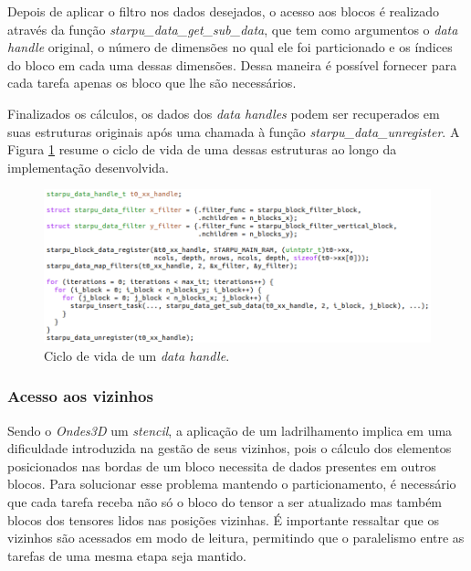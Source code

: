 \documentclass[cic,tc]{iiufrgs}
\begin{document}
Depois de aplicar o filtro nos dados desejados, o acesso aos blocos é realizado através da função \textit{starpu\_data\_get\_sub\_data},
que tem como argumentos o \textit{data handle} original, o número de dimensões no qual ele foi particionado e os índices do bloco em cada
uma dessas dimensões. Dessa maneira é possível fornecer para cada tarefa apenas os bloco que lhe são necessários.

Finalizados os cálculos, os dados dos \textit{data handles} podem ser recuperados em suas estruturas originais após
uma chamada à função \textit{starpu\_data\_unregister}. A Figura \ref{fig:data_cycle} resume o ciclo de vida de uma dessas estruturas ao
longo da implementação desenvolvida.

\begin{figure}[!htb]
  \caption{Ciclo de vida de um \textit{data handle}.}
    \begin{center} 
      \includegraphics[width=35em]{data_cycle}
    \end{center}
    \label{fig:data_cycle}
\end{figure}


\subsubsection{Acesso aos vizinhos}\label{sec:neighborhood}

Sendo o \textit{Ondes3D} um \textit{stencil}, a aplicação de um ladrilhamento implica em uma dificuldade introduzida na gestão de seus
vizinhos, pois o cálculo dos elementos posicionados nas bordas de um bloco necessita de dados presentes em outros blocos. Para solucionar
esse problema mantendo o particionamento, é necessário que cada tarefa receba não só o bloco do tensor a ser atualizado mas também blocos
dos tensores lidos nas posições vizinhas. É importante ressaltar que os vizinhos são acessados em modo de leitura, permitindo
que o paralelismo entre as tarefas de uma mesma etapa seja mantido.
\end{document}
